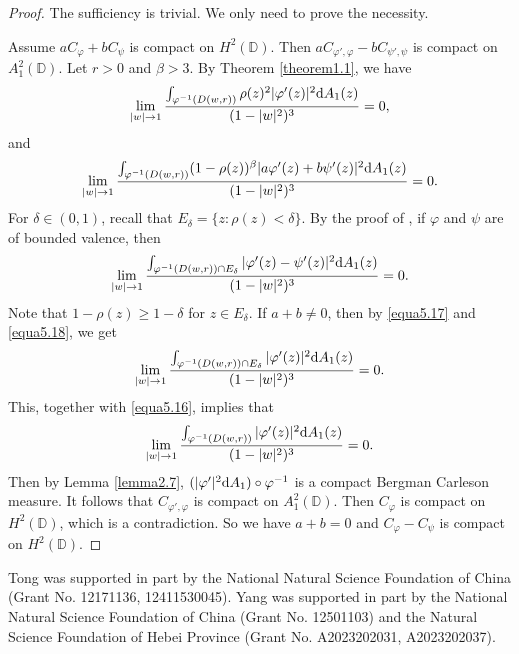 \documentclass[preprint,12pt,times]{elsarticle}
\theoremstyle{definition}
\theoremstyle{remark}
\numberwithin{equation}{section}
\begin{document}
\begin{proof}
The sufficiency is trivial. We only need to prove the necessity.

Assume $aC_{\varphi}+bC_{\psi}$ is compact on $H^2(\mathbb{D})$. Then $aC_{\varphi',\varphi}-bC_{\psi',\psi}$ is compact on $A_1^2(\mathbb{D})$. Let $r>0$ and $\beta>3$. By Theorem \ref{theorem1.1}, we have
\begin{align}\label{equa5.16}
\lim_{|w|\to 1}\frac{\int_{\varphi^{-1}(D(w,r))}\rho(z)^2|\varphi'(z)|^2{\rm d}A_1(z)}{(1-|w|^2)^3}=0,
\end{align}
and 
\begin{align}\label{equa5.17}
\lim_{|w|\to 1}\frac{\int_{\varphi^{-1}(D(w,r))}(1-\rho(z))^{\beta}|a\varphi'(z)+b\psi'(z)|^2{\rm d}A_1(z)}{(1-|w|^2)^3}=0.
\end{align}
For $\delta\in (0,1)$, recall that $E_{\delta}=\{z: \rho(z)<\delta\}$. By the proof of \cite[Theorem 1.3]{4}, if $\varphi$ and $\psi$ are of bounded valence, then
\begin{align}\label{equa5.18}
\lim_{|w|\to 1}\frac{\int_{\varphi^{-1}(D(w,r))\cap E_{\delta}}|\varphi'(z)-\psi'(z)|^2{\rm d}A_1(z)}{(1-|w|^2)^3}=0.
\end{align}
Note that $1-\rho(z)\geq 1-\delta$ for $z\in E_\delta$. If $a+b\neq 0$, then by \eqref{equa5.17} and \eqref{equa5.18}, we get
\begin{align*}
\lim_{|w|\to 1}\frac{\int_{\varphi^{-1}(D(w,r))\cap E_{\delta}}|\varphi'(z)|^2{\rm d}A_1(z)}{(1-|w|^2)^3}=0.
\end{align*}
This, together with \eqref{equa5.16}, implies that
\begin{align*}
\lim_{|w|\to 1}\frac{\int_{\varphi^{-1}(D(w,r))}|\varphi'(z)|^2{\rm d}A_1(z)}{(1-|w|^2)^3}=0.
\end{align*}
Then by Lemma \ref{lemma2.7}, $(|\varphi'|^2{\rm d}A_1)\circ\varphi^{-1}$ is a compact Bergman Carleson measure. It follows that $C_{\varphi',\varphi}$ is compact on $A_1^2(\mathbb{D})$. Then $C_{\varphi}$ is compact on $H^2(\mathbb{D})$, which is a contradiction. So we have $a+b=0$ and $C_{\varphi}-C_{\psi}$ is compact on $H^2(\mathbb{D})$.
\end{proof}



Tong was supported in part by the National Natural Science Foundation of China (Grant No. 12171136, 12411530045). Yang was supported in part by the National Natural Science Foundation of China (Grant No. 12501103) and the Natural Science Foundation of Hebei Province (Grant No. A2023202031, A2023202037).\\
\end{document}
